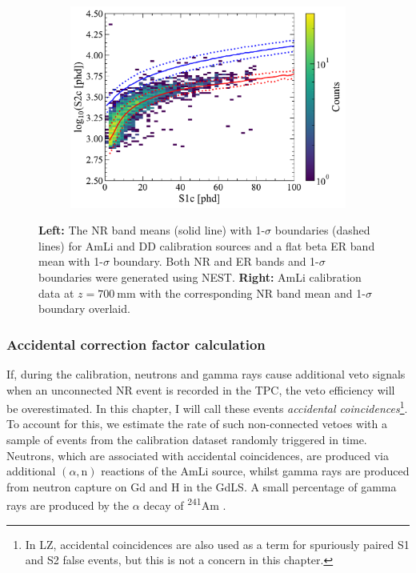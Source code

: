 \begin{enumerate}
\begin{figure}[!ht]
\begin{subfigure}[b]{0.49\textwidth}
        \caption{}
        \label{fig:VetoEff/SR3NRBands}
    \end{subfigure}
    \hfill
    \begin{subfigure}[b]{0.49\textwidth}
        \centering
        \includegraphics[width=\textwidth]{figures/VetoEfficiency/AmLi700_NRBands.pdf}
        \caption{}
        \label{fig:VetoEff/AmLi700_NRBands}
    \end{subfigure}
    \caption[NR and ER bands for the flat beta ER, AmLi NR, and DD NR models alongside a plot of AmLi calibration data with the corresponding NR bands overlaid.]{\textbf{Left:} The NR band means (solid line) with 1-$\sigma$ boundaries (dashed lines) for AmLi and DD calibration sources and a flat beta ER band mean with 1-$\sigma$ boundary. Both NR and ER bands and 1-$\sigma$ boundaries were generated using NEST. \textbf{Right:} AmLi calibration data at $z=700~\text{mm}$ with the corresponding NR band mean and 1-$\sigma$ boundary overlaid.}
    \label{fig:VetoEff/SR3NRBands&AmLi700mmData}
\end{figure}
\end{enumerate}

\subsubsection{Accidental correction factor calculation}\label{sec:VetoEff/AmLiAccCorrection}
If, during the calibration, neutrons and gamma rays cause additional veto signals when an unconnected NR event is recorded in the TPC, the veto efficiency will be overestimated. In this chapter, I will call these events \textit{accidental coincidences}\footnote{In LZ, accidental coincidences are also used as a term for spuriously paired S1 and S2 false events, but this is not a concern in this chapter.}. To account for this, we estimate the rate of such non-connected vetoes with a sample of events from the calibration dataset randomly triggered in time. Neutrons, which are associated with accidental coincidences, are produced via additional $(\alpha,\text{n})$ reactions of the AmLi source, whilst gamma rays are produced from neutron capture on Gd and H in the GdLS. A small percentage of gamma rays are produced by the $\alpha$ decay of \textsuperscript{241}Am \cite{Sazzad:2023uqs}.


